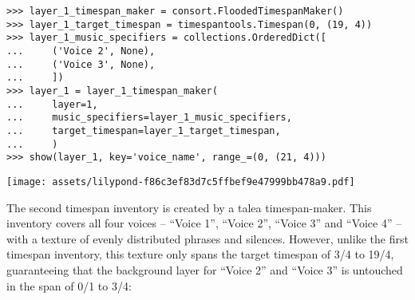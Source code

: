 \begin{abjadbookoutput}
\begin{singlespacing}
\vspace{-0.5\baselineskip}
\begin{lstlisting}
>>> layer_1_timespan_maker = consort.FloodedTimespanMaker()
>>> layer_1_target_timespan = timespantools.Timespan(0, (19, 4))
>>> layer_1_music_specifiers = collections.OrderedDict([
...     ('Voice 2', None),
...     ('Voice 3', None),
...     ])
>>> layer_1 = layer_1_timespan_maker(
...     layer=1,
...     music_specifiers=layer_1_music_specifiers,
...     target_timespan=layer_1_target_timespan,
...     )
>>> show(layer_1, key='voice_name', range_=(0, (21, 4)))
\end{lstlisting}
\noindent\texttt{[image: assets/lilypond-f86c3ef83d7c5ffbef9e47999bb478a9.pdf]}
\end{singlespacing}
\end{abjadbookoutput}

\noindent The second timespan inventory is created by a talea timespan-maker.
This inventory covers all four voices -- \enquote{Voice 1}, \enquote{Voice 2},
\enquote{Voice 3} and \enquote{Voice 4} -- with a texture of evenly distributed
phrases and silences. However, unlike the first timespan inventory, this
texture only spans the target timespan of 3/4 to 19/4, guaranteeing that the
background layer for \enquote{Voice 2} and \enquote{Voice 3} is untouched in
the span of 0/1 to 3/4:

\begin{comment}
<abjad>
layer_2_timespan_maker = consort.TaleaTimespanMaker(
    initial_silence_talea=rhythmmakertools.Talea(
        counts=(0, 1, 3),
        denominator=8,
        ),
    playing_groupings=(1, 2),
    playing_talea=rhythmmakertools.Talea(
        counts=(1, 2, 3, 4),
        denominator=4,
        ),
    silence_talea=rhythmmakertools.Talea(
        counts=(5, 3, 1),
        denominator=8,
        ),
    )
layer_2_target_timespan = timespantools.Timespan((3, 4), (19, 4))
layer_2_music_specifiers = collections.OrderedDict([
    ('Voice 1', None),
    ('Voice 2', None),
    ('Voice 3', None),
    ('Voice 4', None),
    ])
layer_2 = layer_2_timespan_maker(
    layer=2,
    music_specifiers=layer_2_music_specifiers,
    target_timespan=layer_2_target_timespan,
    )
show(layer_2, key='voice_name', range_=(0, (21, 4)))
</abjad>
\end{comment}

